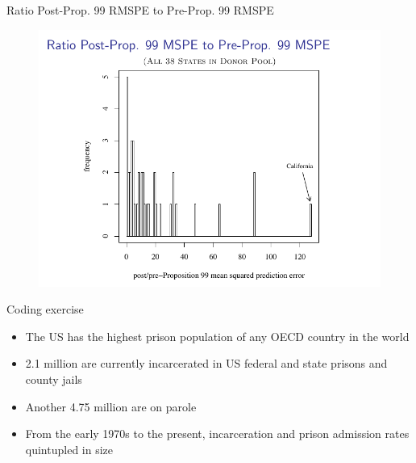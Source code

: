 \documentclass{beamer}
\begin{document}
\begin{frame}{Ratio Post-Prop. 99 RMSPE to Pre-Prop. 99 RMSPE}

	\begin{figure}
	\includegraphics[scale=0.75]{./lecture_includes/abadie_11.pdf}
	\end{figure}
\end{frame}




\begin{frame}{Coding exercise}
	
	\begin{itemize}
	\item The US has the highest prison population of any OECD country in the world 
	\item 2.1 million are currently incarcerated in US federal and state prisons and county jails
	\item Another 4.75 million are on parole
	\item From the early 1970s to the present, incarceration and prison admission rates quintupled in size
	\end{itemize}
\end{frame}
\end{document}
